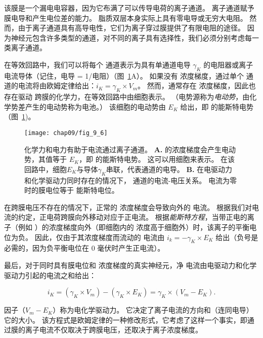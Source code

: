 该膜是一个漏电电容器，因为它布满了可以传导电荷的离子通道。
离子通道赋予膜电导和产生电位差的能力。
脂质双层本身实际上具有零电导或无穷大电阻。
然而，由于离子通道具有高导电性，它们为离子穿过膜提供了有限电阻的途径。
因为神经元包含许多类型的通道，对不同的离子具有选择性，我们必须分别考虑每一类离子通道。


在等效回路中，我们可以将每个  通道表示为具有单通道电导 $\gamma_K$ 的电阻器或离子电流导体（记住，电导 = 1/电阻）（图~\ref{fig:9_6}A）。 
如果没有  浓度梯度，通过单个  通道的电流将由欧姆定律给出：$i_K = \gamma_K \times V_m$。
然而，通常存在  浓度梯度，因此也存在驱动  跨膜的化学力，在等效回路中由细胞表示。
（电势源称为\textit{电动势}，由化学势差产生的电动势称为电池。）
该细胞的电动势由 $E_K$ 给出，即  的能斯特电势（图~\ref{fig:9_6})。


\begin{figure}[htbp]
	\centering
	\texttt{[image: chap09/fig\_9\_6]}
	\caption{化学力和电力有助于电流通过离子通道。
		\textbf{A.}  的浓度梯度会产生电动势，其值等于 $E_K$，即  的能斯特电势。
		这可以用细胞来表示。 在该回路中，细胞$E_K$与导体$\gamma_K$串联，代表通道的电导。
		\textbf{B.} 在电驱动力和化学驱动力同时存在的情况下， 通道的电流-电压关系。
		电流为零时的膜电位等于  能斯特电位。}
	\label{fig:9_6}
\end{figure}


在跨膜电压不存在的情况下，正常的  浓度梯度会导致向外的  电流。
根据我们对电流的约定，正电荷跨膜向外移动对应于正电流。
根据\textit{能斯特方程}，当带正电的离子（例如 ）的浓度梯度向外（即细胞内的  浓度高于细胞外）时，该离子的平衡电位为负。
因此，仅由于其浓度梯度而流动的  电流由 $i_k = -\gamma_K \times E_K$ 给出（负号是必需的，因为负平衡电位在 0 毫伏时产生正电流）。


最后，对于同时具有膜电位和  浓度梯度的真实神经元，净  电流由电驱动力和化学驱动力引起的电流之和给出：

\begin{equation}
	i_K = (\gamma_K \times V_m) - 
		(\gamma_K \times E_K) =
		\gamma_K \times (V_m - E_K).
\end{equation}


因子（$V_m - E_K$）称为电化学驱动力。
它决定了离子电流的方向和（连同电导）它的大小。
该方程式是欧姆定律的一种修改形式，它考虑了这样一个事实，即通过膜的离子电流不仅取决于跨膜电压，还取决于离子浓度梯度。



